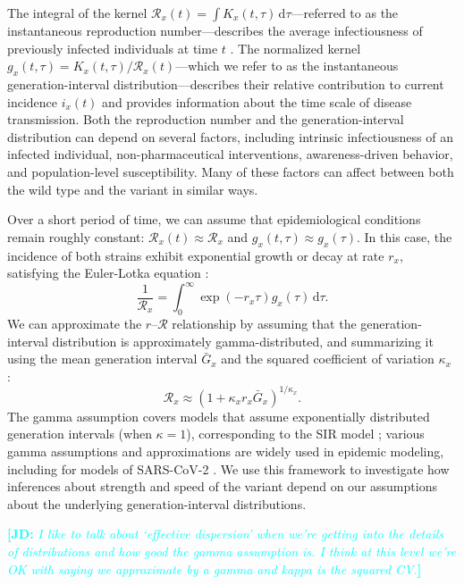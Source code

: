 \documentclass[12pt]{article}
\newcommand{\comment}{\showcomment}
\newcommand{\showcomment}[3]{\textcolor{#1}{\textbf{[#2: }\textsl{#3}\textbf{]}}}
\newcommand{\jd}[1]{\comment{cyan}{JD}{#1}}
\newcommand{\RR}{\ensuremath{{\mathcal R}}\xspace}
\newcommand{\dd}[1]{\ensuremath{\, \mathrm{d}#1}}
\newcommand{\dtau}{\dd{\tau}}
\begin{document}
The integral of the kernel $\RR_x(t) = \int K_x(t, \tau) \dtau$---referred to as the instantaneous reproduction number---describes the average infectiousness of previously infected individuals at time $t$ \citep{fraser2007estimating}.
The normalized kernel $g_x(t, \tau) = K_x(t, \tau)/\RR_x(t)$---which we refer to as the instantaneous generation-interval distribution---describes their relative contribution to current incidence $i_x(t)$ and provides information about the time scale of disease transmission.
Both the reproduction number and the generation-interval distribution can depend on several factors, including intrinsic infectiousness of an infected individual, non-pharmaceutical interventions, awareness-driven behavior, and population-level susceptibility.
Many of these factors can affect between both the wild type and the variant in similar ways.

Over a short period of time, we can assume that epidemiological conditions remain roughly constant: $\RR_x(t) \approx \RR_x$ and $g_x(t, \tau) \approx g_x(\tau)$.
In this case, the incidence of both strains exhibit exponential growth or decay at rate $r_x$, satisfying the Euler-Lotka equation \citep{wallinga2007generation}:
\begin{equation}
\frac{1}{\RR_x} = \int_0^\infty \exp(- r_x \tau) g_x(\tau) \dtau.
\end{equation}
We can approximate the $r$--$\RR$ relationship by assuming that the generation-interval distribution is approximately gamma-distributed, and summarizing it using the mean generation interval $\bar{G}_x$ and the squared coefficient of variation $\kappa_x$ \citep{park2019practical}:
\begin{equation}
\RR_x \approx (1 + \kappa_x r_x \bar{G}_x)^{1/\kappa_x}.
\end{equation}
The gamma assumption covers models that assume exponentially distributed generation intervals (when $\kappa=1$), corresponding to the SIR model \citep{anderson1991infectious}; various gamma assumptions and approximations are widely used in epidemic modeling, including for models of SARS-CoV-2 \citep{doi:10.1098/rsif.2020.0144}.
We use this framework to investigate how inferences about strength and speed of the variant depend on our assumptions about the underlying generation-interval distributions.

\jd{I like to talk about `effective dispersion' when we're getting into the details of distributions and how good the gamma assumption is. I think at this level we're OK with saying we approximate by a gamma and kappa is the squared CV.}
\end{document}
